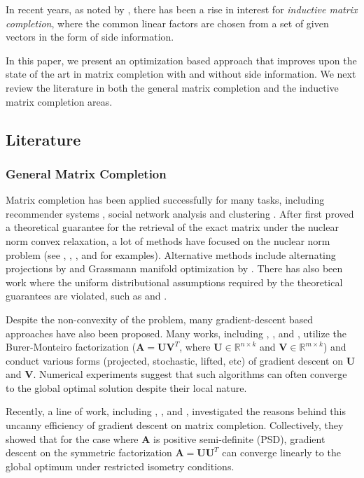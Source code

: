 \documentclass[twoside,11pt]{article}
\newcommand{\md}[1]{\mathbb{#1}}
\begin{document}
In recent years, as noted by \cite{nazarov2018sparse},  there has been a rise in interest for \emph{inductive matrix completion}, where the common linear factors are chosen from a set of given vectors in the form of side information.

In this paper, we present an optimization based approach that improves upon the state of the art in matrix completion with and without side information. We next  review the literature in both the general matrix completion  and  the inductive matrix completion areas.
\subsection*{Literature}
\subsubsection*{General Matrix Completion}
Matrix completion has been applied successfully for many tasks, including recommender systems \cite{koren2009matrix}, social network analysis \cite{chiang2014prediction} and clustering \cite{chen2014clustering}. After \cite{candes2009exact} first proved a theoretical guarantee for the retrieval of the exact matrix under the nuclear norm convex relaxation, a lot of methods have focused on the nuclear norm problem (see \cite{SoftImpute}, \cite{beck2009fast}, \cite{jain2010guaranteed}, and \cite{tanner2013normalized} for examples). Alternative methods include alternating projections by \cite{recht2013parallel} and Grassmann manifold optimization by \cite{keshavan2009matrix}. There has also been work where the uniform distributional assumptions required by the theoretical guarantees are violated, such as \cite{negahban2012restricted} and \cite{chen2014coherent}. 

Despite the non-convexity of the problem, many gradient-descent based approaches have also been proposed. Many works, including \cite{koren2009matrix}, \cite{jain2015fast}, \cite{zheng2016convergence} and \cite{jin2016provable}, utilize the Burer-Monteiro factorization ($\bm{A}=\bm{U}\bm{V}^T$, where $\bm{U} \in \md{R}^{n \times k}$ and $\bm{V}\in \md{R}^{m \times k}$) and conduct various forms (projected, stochastic, lifted, etc) of gradient descent on $\bm{U}$ and $\bm{V}$. Numerical experiments suggest that such algorithms can often converge to the global optimal solution despite their local nature.

Recently, a line of work, including \cite{chen2015fast}, \cite{ge2016matrix}, and \cite{ma2019implicit}, investigated the reasons behind this uncanny efficiency of gradient descent on matrix completion. Collectively, they showed that for the case where $\bm{A}$ is positive semi-definite (PSD), gradient descent on the symmetric factorization $\bm{A}=\bm{U}\bm{U}^T$ can converge linearly to the global optimum under restricted isometry conditions. 
\end{document}
